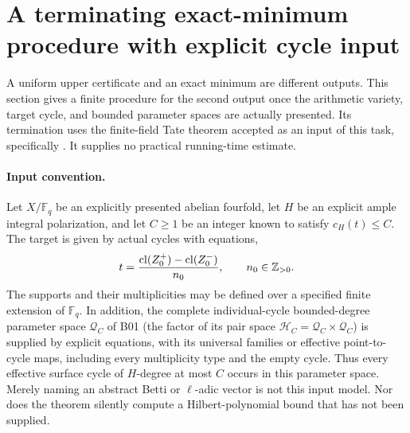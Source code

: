 \section{A terminating exact-minimum procedure with explicit cycle input}
\label{sec:exact-algorithm}

A uniform upper certificate and an exact minimum are different outputs.
This section gives a finite procedure for the second output once the
arithmetic variety, target cycle, and bounded parameter spaces are
actually presented. Its termination uses the finite-field Tate theorem
accepted as an input of this task, specifically
\cite[Theorem 3.1 and \S3.2]{MilneReport2026}. It supplies no practical
running-time estimate.

\paragraph{Input convention.}
Let $X/\mathbb F_q$ be an explicitly presented abelian fourfold, let
$H$ be an explicit ample integral polarization, and let $C\geq1$ be an
integer known to satisfy $c_H(t)\leq C$. The target is given by actual
cycles with equations,
\[
             t=\frac{\operatorname{cl}(Z_0^+)-\operatorname{cl}(Z_0^-)}{n_0},
             \qquad n_0\in\mathbb Z_{>0}.
\]
The supports and their multiplicities may be defined over a specified
finite extension of $\mathbb F_q$. In addition, the complete
individual-cycle bounded-degree parameter space $\mathcal Q_C$ of B01
(the factor of its pair space $\mathcal H_C=\mathcal Q_C\times\mathcal Q_C$) is supplied by
explicit equations, with its universal families or effective
point-to-cycle maps, including every multiplicity type and the empty
cycle. Thus every effective surface cycle of $H$-degree at most $C$
occurs in this parameter space. Merely naming an abstract Betti or
$\ell$-adic vector is not this input model. Nor does the theorem silently
compute a Hilbert-polynomial bound that has not been supplied.

